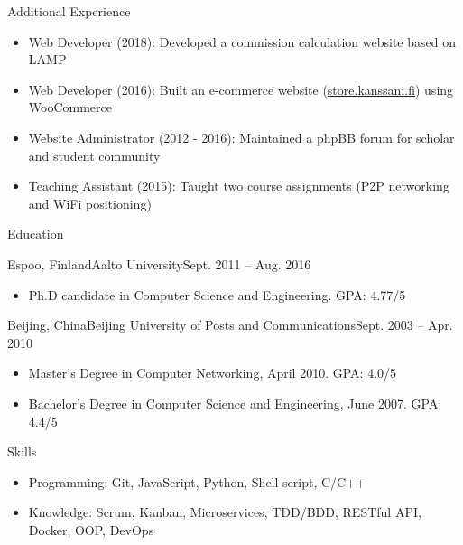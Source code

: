 \documentclass[print]{mcdowellcv}
\begin{document}
	\begin{cvsection}{Additional Experience}
		\begin{cvsubsection}{}{}{}	
			\begin{itemize}
				\item Web Developer (2018): Developed a commission calculation website based on LAMP
				\item Web Developer (2016): Built an e-commerce website (\url{store.kanssani.fi}) using WooCommerce
				\item Website Administrator (2012 - 2016): Maintained a phpBB forum for scholar and student community
				\item Teaching Assistant (2015): Taught two course assignments (P2P networking and WiFi positioning)
			\end{itemize}
		\end{cvsubsection}
	\end{cvsection}
	
	\begin{cvsection}{Education}
		\begin{cvsubsection}{Espoo, Finland}{Aalto University}{Sept. 2011 -- Aug. 2016}
			\begin{itemize}
				\item Ph.D candidate in Computer Science and Engineering. GPA: 4.77/5
			\end{itemize}
		\end{cvsubsection}

		\begin{cvsubsection}[2]{Beijing, China}{Beijing University of Posts and Communications}{Sept. 2003 --  Apr. 2010}
			\begin{itemize}
				\item Master's Degree in Computer Networking, April 2010. GPA: 4.0/5				 
				\item Bachelor's Degree in Computer Science and Engineering, June 2007. GPA: 4.4/5
			\end{itemize}
		\end{cvsubsection}
	\end{cvsection}
	
	\begin{cvsection}{Skills}
		\begin{cvsubsection}{}{}{}	
			\begin{itemize}
				\item Programming: Git, JavaScript, Python, Shell script, C/C++
				\item Knowledge: Scrum, Kanban, Microservices, TDD/BDD, RESTful API, Docker, OOP, DevOps
			\end{itemize}
		\end{cvsubsection}
	\end{cvsection}
\end{document}
